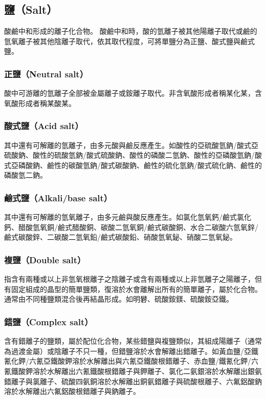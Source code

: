 \documentclass[a4paper,12pt]{article}
\begin{document}
\subsection{鹽（Salt）}
酸鹼中和形成的離子化合物。
酸鹼中和時，酸的氫離子被其他陽離子取代或鹼的氫氧離子被其他陰離子取代，依其取代程度，可將單鹽分為正鹽、酸式鹽與鹼式鹽。
\subsubsection{正鹽（Neutral salt）}
酸中可游離的氫離子全部被金屬離子或銨離子取代。非含氧酸形成者稱某化某，含氧酸形成者稱某酸某。
\subsubsection{酸式鹽（Acid salt）}
其中還有可解離的氫離子，由多元酸與鹼反應產生。如酸性的亞硫酸氫鈉/酸式亞硫酸鈉、酸性的硫酸氫鈉/酸式硫酸鈉、酸性的磷酸二氫鈉、酸性的亞磷酸氫鈉/酸式亞磷酸鈉、鹼性的碳酸氫鈉/酸式碳酸鈉、鹼性的硫化氫鈉/酸式硫化鈉、鹼性的磷酸氫二鈉。
\subsubsection{鹼式鹽（Alkali/base salt）}
其中還有可解離的氫氧離子，由多元鹼與酸反應產生。如氯化氫氧鈣/鹼式氯化鈣、醋酸氫氧銅/鹼式醋酸銅、碳酸二氫氧銅/鹼式碳酸銅、水合二碳酸六氫氧鋅/鹼式碳酸鋅、二碳酸二氫氧鉛/鹼式碳酸鉛、硝酸氫氧鉍、硝酸二氫氧鉍。
\subsubsection{複鹽（Double salt）}
指含有兩種或以上非氫氧根離子之陰離子或含有兩種或以上非氫離子之陽離子，但有固定組成的晶型的簡單鹽類，復溶於水會離解出所有的簡單離子，屬於化合物。通常由不同種鹽類混合後再結晶形成。如明礬、硫酸銨鎂、硫酸銨亞鐵。
\subsubsection{錯鹽（Complex salt）}
含有錯離子的鹽類，屬於配位化合物，某些錯鹽與複鹽類似，其組成陽離子（通常為過渡金屬）或陰離子不只一種，但錯鹽溶於水會解離出錯離子。如黃血鹽/亞鐵氰化鉀/六氰亞鐵酸鉀溶於水解離出與六氰亞鐵酸根錯離子、赤血鹽/鐵氰化鉀/六氰鐵酸鉀溶於水解離出六氰鐵酸根錯離子與鉀離子、氯化二氨銀溶於水解離出銀氨錯離子與氯離子、硫酸四氨銅溶於水解離出銅氨錯離子與硫酸根離子、六氟鋁酸鈉溶於水解離出六氟鋁酸根錯離子與鈉離子。
\end{document}
